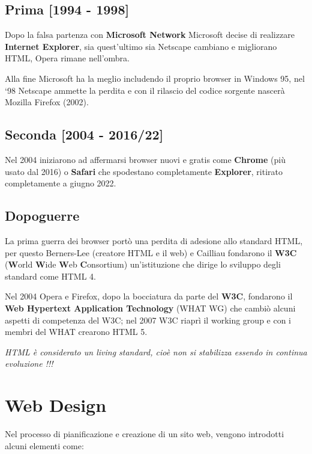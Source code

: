 \subsection{Prima {[}1994 - 1998{]}}\label{prima-1994---1998}

Dopo la falsa partenza con \textbf{Microsoft Network} Microsoft decise
di realizzare \textbf{Internet Explorer}, sia quest'ultimo sia Netscape
cambiano e migliorano HTML, Opera rimane nell'ombra.

Alla fine Microsoft ha la meglio includendo il proprio browser in
Windows 95, nel `98 Netscape ammette la perdita e con il rilascio del
codice sorgente nascerà Mozilla Firefox (2002).

\subsection{Seconda {[}2004 - 2016/22{]}}\label{seconda-2004---201622}

Nel 2004 iniziarono ad affermarsi browser nuovi e gratis come
\textbf{Chrome} (più usato dal 2016) o \textbf{Safari} che spodestano
completamente \textbf{Explorer}, ritirato completamente a giugno 2022.

\subsection{Dopoguerre}\label{dopoguerre}

La prima guerra dei browser portò una perdita di adesione allo standard
HTML, per questo Berners-Lee (creatore HTML e il web) e Cailliau
fondarono il \textbf{W3C} (\textbf{W}orld \textbf{W}ide \textbf{W}eb
\textbf{C}onsortium) un'istituzione che dirige lo sviluppo degli
standard come HTML 4.

Nel 2004 Opera e Firefox, dopo la bocciatura da parte del \textbf{W3C},
fondarono il \textbf{Web Hypertext Application Technology} (WHAT WG) che
cambiò alcuni aspetti di competenza del W3C; nel 2007 W3C riaprì il
working group e con i membri del WHAT crearono HTML 5.

\emph{HTML è considerato un living standard, cioè non si stabilizza
essendo in continua evoluzione !!!}

\section{Web Design}\label{web-design}

Nel processo di pianificazione e creazione di un sito web, vengono
introdotti alcuni elementi come:

